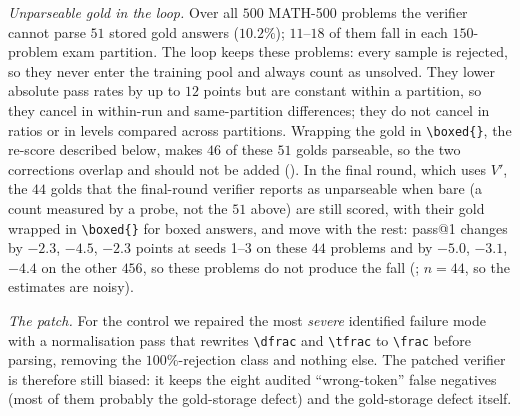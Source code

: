 \documentclass[runningheads]{llncs}
\begin{document}
\emph{Unparseable gold in the loop.} Over all $500$ MATH-500 problems the
verifier cannot parse $51$ stored gold answers ($10.2\%$); $11$--$18$ of them fall
in each $150$-problem exam partition. The loop keeps these problems: every
sample is rejected, so they never enter the training pool and always count as
unsolved. They lower absolute pass rates by up to $12$ points but are constant
within a partition, so they cancel in within-run and same-partition
differences; they do not cancel in ratios or in levels compared across
partitions. Wrapping the gold in \verb|\boxed{}|, the re-score described
below, makes $46$ of these $51$ golds parseable, so the two corrections overlap
and should not be added ().
In the final round, which uses $V'$, the $44$ golds that the final-round verifier reports as unparseable when bare (a count measured by a probe, not the $51$ above) are still scored, with their gold wrapped in \verb|\boxed{}| for boxed answers, and move with the rest: pass@1 changes by $-2.3$, $-4.5$, $-2.3$ points at seeds 1--3 on these $44$ problems and by $-5.0$, $-3.1$, $-4.4$ on the other $456$, so these problems do not produce the fall (; $n=44$, so the estimates are noisy).

\emph{The patch.} For the control we repaired the most \emph{severe} identified
failure mode with a normalisation pass that rewrites \verb|\dfrac| and
\verb|\tfrac| to \verb|\frac| before parsing, removing the $100\%$-rejection class
and nothing else. The patched verifier is therefore still biased: it keeps the
eight audited ``wrong-token'' false negatives (most of them probably the
gold-storage defect) and the gold-storage defect itself.
\end{document}

